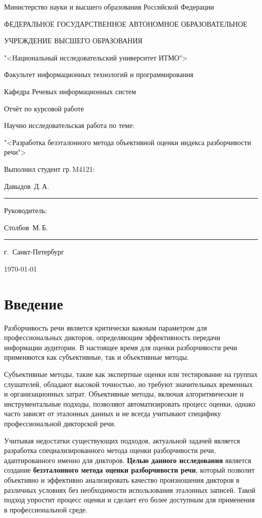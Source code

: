 \documentclass[oneside, final, 14pt]{extarticle}
\begin{document}
\begin{titlepage}
  \centerline{Министерство науки и высшего образования Российской Федерации}
  \medskip
  \centerline{ФЕДЕРАЛЬНОЕ ГОСУДАРСТВЕННОЕ АВТОНОМНОЕ ОБРАЗОВАТЕЛЬНОЕ}
  \medskip
  \centerline{УЧРЕЖДЕНИЕ ВЫСШЕГО ОБРАЗОВАНИЯ}
  \medskip
  \centerline{"<Национальный исследовательский университет ИТМО">}
  \vfill
  \centerline{Факультет информационных технологий и программирования}
  \medskip
  \centerline{Кафедра Речевых информационных систем}
  \vfill
  \vfill
  \centerline{Отчёт по курсовой работе}
  \vfill
  \centerline{Научно исследовательская работа по теме:}
  \medskip
  \centerline{"<Разработка безэталонного метода объективной оценки индекса разборчивости речи">}
  \vfill
  \null \hfill
  \begin{minipage}{0.4\textwidth}
    Выполнил студент гр.\,M4121:
	\par
	\medskip
	Давыдов~Д.\,А.\,
	\rule{3.5cm}{0.25pt}
	\par
	\medskip
	Руководитель:
	\par
	\medskip
	Столбов~М.\,Б.\,
	\rule{3.5cm}{0.25pt}
  \end{minipage}
  \vfill
  \centerline{г.~Санкт-Петербург}
  \centerline{\today}
\end{titlepage}
\setcounter{page}{2}

\tableofcontents

\newpage
\section*{Введение}

Разборчивость речи является критически важным параметром для профессиональных дикторов, определяющим эффективность передачи информации аудитории. В настоящее время для оценки разборчивости речи применяются как субъективные, так и объективные методы.

Субъективные методы, такие как экспертные оценки или тестирование на группах слушателей, обладают высокой точностью, но требуют значительных временных и организационных затрат. Объективные методы, включая алгоритмические и инструментальные подходы, позволяют автоматизировать процесс оценки, однако часто зависят от эталонных данных и не всегда учитывают специфику профессиональной дикторской речи.

Учитывая недостатки существующих подходов, актуальной задачей является разработка специализированного метода оценки разборчивости речи, адаптированного именно для дикторов. \textbf{Целью данного исследования} является создание \textbf{безэталонного метода оценки разборчивости речи}, который позволит объективно и эффективно анализировать качество произношения дикторов в различных условиях без необходимости использования эталонных записей. Такой подход упростит процесс оценки и сделает его более доступным для применения в профессиональной среде.
\end{document}
